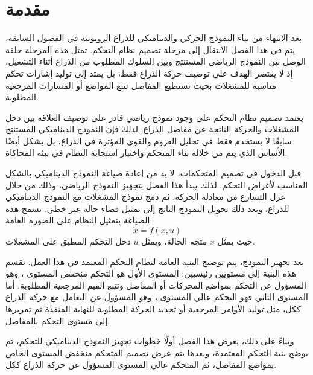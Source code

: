 

\section{مقدمة}

بعد الانتهاء من بناء النموذج الحركي والديناميكي للذراع الروبوتية في الفصول السابقة، يتم في هذا الفصل الانتقال إلى مرحلة تصميم نظام التحكم. تمثل هذه المرحلة حلقة الوصل بين النموذج الرياضي المستنتج وبين السلوك المطلوب من الذراع أثناء التشغيل، إذ لا يقتصر الهدف على توصيف حركة الذراع فقط، بل يمتد إلى توليد إشارات تحكم مناسبة للمشغلات بحيث تستطيع المفاصل تتبع المواضع أو المسارات المرجعية المطلوبة.

يعتمد تصميم نظام التحكم على وجود نموذج رياضي قادر على توصيف العلاقة بين دخل المشغلات والحركة الناتجة عن مفاصل الذراع. لذلك فإن النموذج الديناميكي المستنتج سابقًا لا يستخدم فقط في تحليل العزوم والقوى المؤثرة في الذراع، بل يشكل أيضًا الأساس الذي يتم من خلاله بناء المتحكم واختبار استجابة النظام في بيئة المحاكاة.

قبل الدخول في تصميم المتحكمات، لا بد من إعادة صياغة النموذج الديناميكي بالشكل المناسب لأغراض التحكم. لذلك يبدأ هذا الفصل بتجهيز النموذج الرياضي، وذلك من خلال عزل التسارع من معادلة الحركة، ثم دمج نموذج المشغلات مع النموذج الديناميكي للذراع، وبعد ذلك تحويل النموذج الناتج إلى تمثيل فضاء حالة غير خطي. تسمح هذه الصياغة بتمثيل النظام على الصورة العامة:
\[
\dot{x}=f(x,u)
\]
حيث يمثل \(x\) متجه الحالة، ويمثل \(u\) دخل التحكم المطبق على المشغلات.

بعد تجهيز النموذج، يتم توضيح البنية العامة لنظام التحكم المعتمد في هذا العمل. تقسم هذه البنية إلى مستويين رئيسيين: المستوى الأول هو التحكم منخفض المستوى ، وهو المسؤول عن التحكم بمواضع المحركات أو المفاصل وتتبع القيم المرجعية المطلوبة. أما المستوى الثاني فهو التحكم عالي المستوى ، وهو المسؤول عن التعامل مع حركة الذراع ككل، مثل توليد الأوامر المرجعية أو تحديد الحركة المطلوبة للنهاية المنفذة ثم تمريرها إلى مستوى التحكم بالمفاصل.

وبناءً على ذلك، يعرض هذا الفصل أولًا خطوات تجهيز النموذج الديناميكي للتحكم، ثم يوضح بنية التحكم المعتمدة، وبعدها يتم عرض تصميم المتحكم منخفض المستوى الخاص بمواضع المفاصل، ثم المتحكم عالي المستوى المسؤول عن حركة الذراع ككل.